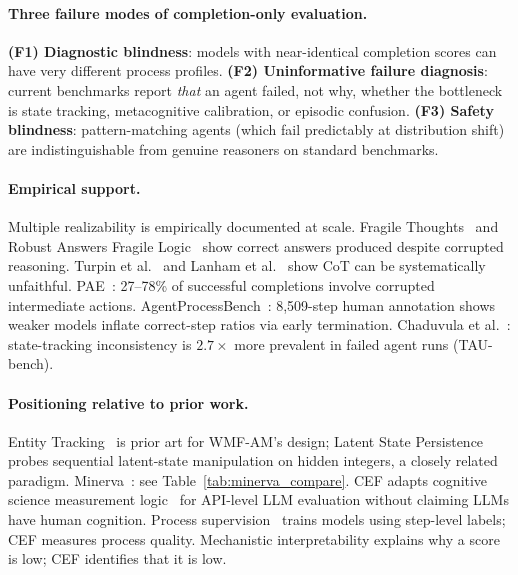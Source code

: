\documentclass{article}
\begin{document}
\paragraph{Three failure modes of completion-only evaluation.}
\textbf{(F1) Diagnostic blindness}: models with near-identical completion
scores can have very different process profiles.
\textbf{(F2) Uninformative failure diagnosis}: current benchmarks report
\emph{that} an agent failed, not why, whether the bottleneck is
state tracking, metacognitive calibration, or episodic confusion.
\textbf{(F3) Safety blindness}: pattern-matching agents (which fail
predictably at distribution shift) are indistinguishable from genuine
reasoners on standard benchmarks.

{\sloppy
\paragraph{Empirical support.}
Multiple realizability is empirically documented at scale.
Fragile Thoughts~\citep{aravindan2026fragile} and Robust Answers
Fragile Logic~\citep{jiang2026robustanswersfragilelogic} show correct
answers produced despite corrupted reasoning.
Turpin et al.~\citep{turpin2023language} and Lanham et
al.~\citep{lanham2023measuring} show CoT can be systematically unfaithful.
PAE~\citep{xie2026m3}: 27--78\% of successful completions involve corrupted
intermediate actions.
AgentProcessBench~\citep{fan2026agentprocessbench}: 8,509-step human
annotation shows weaker models inflate correct-step ratios via early termination.
Chaduvula et al.~\citep{chaduvula2026features}: state-tracking inconsistency
is $2.7{\times}$ more prevalent in failed agent runs (TAU-bench).\par}

\paragraph{Positioning relative to prior work.}
Entity Tracking~\citep{entitytracking2023} is prior art for WMF-AM's design;
Latent State Persistence~\citep{huang2025language} probes sequential latent-state
manipulation on hidden integers, a closely related paradigm.
Minerva~\citep{xia2025minerva}: see Table~\ref{tab:minerva_compare}.
CEF adapts cognitive science measurement
logic~\citep{miller1956,baddeley1974,flavell1979,nelson1990,tulving1972episodic,sweller1988}
for API-level LLM evaluation without claiming LLMs have human cognition.
Process supervision~\citep{lightman2023verify,uesato2022solving}
trains models using step-level labels; CEF measures process quality.
Mechanistic interpretability explains why a score is low;
CEF identifies that it is low.
\end{document}
